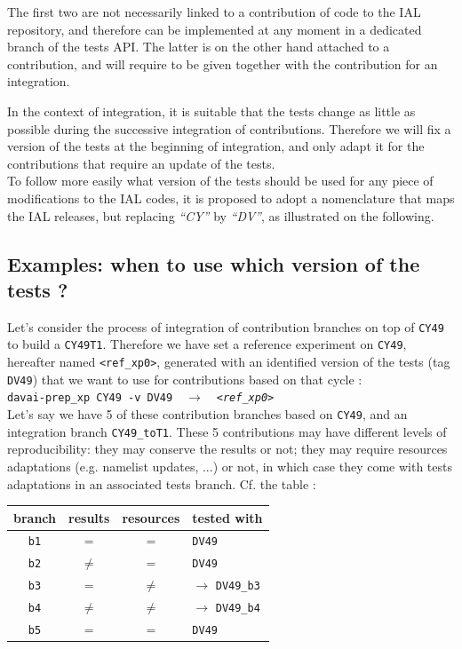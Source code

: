 \documentclass[a4paper,10pt,twoside]{article}
\begin{document}
The first two are not necessarily linked to a contribution of code to the IAL repository, and therefore can be implemented at any moment in a dedicated branch of the tests API.
The latter is on the other hand attached to a contribution, and will require to be given together with the contribution for an integration.

In the context of integration, it is suitable that the tests change as little as possible during the successive integration of contributions. Therefore we will fix a version of the tests at the beginning of integration, and only adapt it for the contributions that require an update of the tests.\\

To follow more easily what version of the tests should be used for any piece of modifications to the IAL codes, it is proposed to adopt a nomenclature that maps the IAL releases, but replacing \textit{``CY''} by \textit{``DV''}, as illustrated on the following.


\subsection{Examples: when to use which version of the tests ?}

Let's consider the process of integration of contribution branches on top of \texttt{CY49} to build a \texttt{CY49T1}.
Therefore we have set a reference experiment on \texttt{CY49}, hereafter named \texttt{<ref\_xp0>}, generated with an identified version of the tests (tag \texttt{DV49}) that we want to use for contributions based on that cycle :\\
\texttt{davai-prep\_xp CY49 -v DV49} $~~~\rightarrow~~~$ \texttt{\textit{<ref\_xp0>}}\\

Let's say we have 5 of these contribution branches based on \texttt{CY49}, and an integration branch \texttt{CY49\_toT1}. These 5 contributions may have different levels of reproducibility: they may conserve the results or not; they may require resources adaptations (e.g. namelist updates, ...) or not, in which case they come with tests adaptations in an associated tests branch. Cf. the table :\\

\begin{tabular}{|c|c|c|l|}
\hline
 branch & results & resources & tested with\\
 \hline
 \texttt{b1} & $=$ & $=$ & \texttt{DV49}\\
 \texttt{b2} & $\neq$ & $=$ & \texttt{DV49}\\
 \texttt{b3} & $=$ & $\neq$ & $\rightarrow$ \texttt{DV49\_b3}\\
 \texttt{b4} & $\neq$ & $\neq$ & $\rightarrow$ \texttt{DV49\_b4}\\
 \texttt{b5} & $=$ & $=$ & \texttt{DV49}\\
 \hline
\end{tabular}\\
\end{document}
